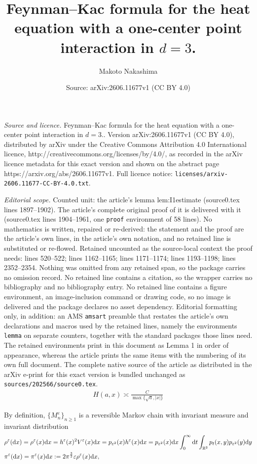 \documentclass[10pt,a4paper]{amsart}
\title{Feynman--Kac formula for the heat equation with a one-center point interaction in $d=3$.}
\author{Makoto Nakashima}
\date{Source: arXiv:2606.11677v1 (CC BY 4.0)}
\newcommand{\R}{{\mathbb{R}}}
\newcommand{\dd}{\text{\rm d}}             %
\newcommand{\e}{\varepsilon}
\begin{document}
\maketitle

\noindent\emph{Source and licence.} Feynman--Kac formula for the heat equation with a one-center point interaction in $d=3$.. Version arXiv:2606.11677v1 (CC BY 4.0), distributed by arXiv under the Creative Commons Attribution 4.0 International licence, http://creativecommons.org/licenses/by/4.0/, as recorded in the arXiv licence metadata for this exact version and shown on the abstract page https://arxiv.org/abs/2606.11677v1. Full licence notice: \texttt{licenses/arxiv-2606.11677-CC-BY-4.0.txt}.\par\smallskip

\noindent\textit{Editorial scope.} Counted unit: the article's lemma lem:I1estimate (source0.tex lines 1897--1902). The article's complete original proof of it is delivered with it (source0.tex lines 1904--1961, one \texttt{proof} environment of 58 lines). No mathematics is written, repaired or re-derived: the statement and the proof are the article's own lines, in the article's own notation, and no retained line is substituted or re-flowed.  Retained uncounted as the source-local context the proof needs: lines 520--522; lines 1162--1165; lines 1171--1174; lines 1193--1198; lines 2352--2354.  Nothing was omitted from any retained span, so the package carries no omission record.  No retained line contains a citation, so the wrapper carries no bibliography and no bibliography entry.  No retained line contains a figure environment, an image-inclusion command or drawing code, so no image is delivered and the package declares no asset dependency.  Editorial formatting only, in addition: an AMS \texttt{amsart} preamble that restates the article's own declarations and macros used by the retained lines, namely the environments \texttt{lemma} on separate counters, together with the standard packages those lines need.  The retained environments print in this document as Lemma 1 in order of appearance, whereas the article prints the same items with the numbering of its own full document.  The complete native source of the article as distributed in the arXiv e-print for this exact version is bundled unchanged as \texttt{sources/202566/source0.tex}.
\begin{align}
H(a,x)\asymp \frac{C}{\max\{\sqrt{a},|x|\}}\label{eq:Hprop5}
\end{align}

By definition,  $\{M^\e_n\}_{n\geq 1}$  is a  reversible Markov chain with invariant measure and invariant distribution  \begin{align}
&\rho^\e(\dd x)=\rho^\e(x)\dd x=h^\e(x)^2V^\e(x)\dd x=p_{\e^2}(x)h^\e(x)\dd x=p_{\e^2}(x)\dd x\int_0^\infty\dd t \int_{\R^3}p_t(x,y)p_{\e^2}(y)\dd y\label{eq:invariantmeasure}\\
&\pi^\e(\dd x)=\pi^\e(x)\dd x:=2\pi^{\frac{3}{2}}\e \rho^\e(x)\dd x,\label{eq:invariantdistribution}
\end{align}
\end{document}
